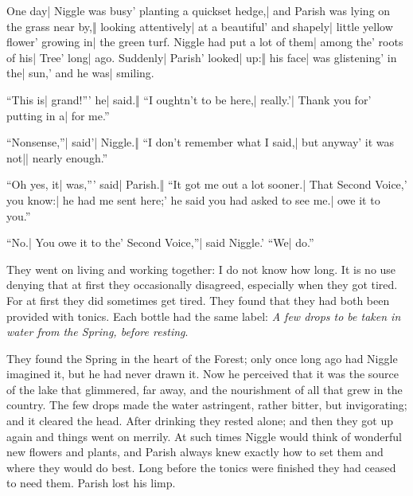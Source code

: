 \begin{itemize}
\halfone One day| Niggle was busy' planting a quickset hedge,| and Parish was lying on the grass near by,‖ looking attentively| at a beautiful' and shapely| little yellow flower' growing in| the green turf.
\quartertwo Niggle had put a lot of them| among the' roots of his| Tree' long| ago.
\halfone Suddenly| Parish' looked| up:‖ his face| was glistening' in the| sun,' and he was| smiling.
\end{itemize}


\begin{itemize}
\halftwo “This is| grand!”' he| said.‖ “I oughtn’t to be here,| really.'| Thank you for' putting in a|  for me.”
\end{itemize}

\begin{itemize}
\halfone “Nonsense,”| said'| Niggle.‖ “I don’t remember what I said,| but anyway' it was not|| nearly enough.”
\end{itemize}

\begin{itemize}
\halftwo “Oh yes, it| was,”' said| Parish.‖ “It got me out a lot sooner.| That Second Voice,' you know:| he had me sent here;' he said you had asked to see me.|  owe it to you.”
\end{itemize}

\begin{itemize}
\quarterfour “No.| You owe it to the' Second Voice,”| said Niggle.' “We|  do.”
\end{itemize}

They went on living and working together: I do not know how long. It is no use denying that at first they occasionally disagreed, especially when they got tired. For at first they did sometimes get tired. They found that they had both been provided with tonics. Each bottle had the same label: \emph{A few drops to be taken in water from the Spring, before resting}.

They found the Spring in the heart of the Forest; only once long ago had Niggle imagined it, but he had never drawn it. Now he perceived that it was the source of the lake that glimmered, far away, and the nourishment of all that grew in the country. The few drops made the water astringent, rather bitter, but invigorating; and it cleared the head. After drinking they rested alone; and then they got up again and things went on merrily. At such times Niggle would think of wonderful new flowers and plants, and Parish always knew exactly how to set them and where they would do best. Long before the tonics were finished they had ceased to need them. Parish lost his limp.

